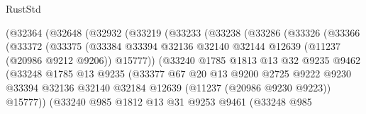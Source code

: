 \begin{lexlean}{RustStd}
\begin{coremodule}
                    (@32364
                      (@32648
                        (@32932
                          (@33219
                            (@33233
                              (@33238
                                (@33286
                                  (@33326
                                    (@33366
                                      (@33372
                                        (@33375
                                          (@33384
                                            @33394
                                            @32136
                                            @32140
                                            @32144
                                            @12639
                                            (@11237 (@20986 @9212 @9206))
                                            @15777))
                                        (@33240
                                          @1785
                                          @1813
                                          @13
                                          @32
                                          @9235
                                          @9462
                                          (@33248
                                            @1785
                                            @13
                                            @9235
                                            (@33377
                                              @67
                                              @20
                                              @13
                                              @9200
                                              @2725
                                              @9222
                                              @9230
                                              @33394
                                              @32136
                                              @32140
                                              @32184
                                              @12639
                                              (@11237 (@20986 @9230 @9223))
                                              @15777))
                                          (@33240
                                            @985
                                            @1812
                                            @13
                                            @31
                                            @9253
                                            @9461
                                            (@33248
                                              @985

\end{coremodule}
\end{lexlean}
